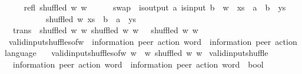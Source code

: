 \begin{isabellebody}
\ \ \isanewline
\ \ refl{\isacharcolon}{\kern0pt}\ {\isachardoublequoteopen}shuffled\ w\ w{\isachardoublequoteclose}\ {\isacharbar}{\kern0pt}\isanewline
\ \ \isanewline
\ \ swap{\isacharcolon}{\kern0pt}\ {\isachardoublequoteopen}{\isasymlbrakk}\ is{\isacharunderscore}{\kern0pt}output\ a{\isacharsemicolon}{\kern0pt}\ is{\isacharunderscore}{\kern0pt}input\ b\ {\isacharsemicolon}{\kern0pt}\ w\ {\isacharequal}{\kern0pt}\ {\isacharparenleft}{\kern0pt}xs\ {\isacharat}{\kern0pt}\ a\ {\isacharhash}{\kern0pt}\ b\ {\isacharhash}{\kern0pt}\ ys{\isacharparenright}{\kern0pt}\ {\isasymrbrakk}\ \isanewline
\ \ \ \ \ \ \ \ \ {\isasymLongrightarrow}\ shuffled\ w\ {\isacharparenleft}{\kern0pt}xs\ {\isacharat}{\kern0pt}\ b\ {\isacharhash}{\kern0pt}\ a\ {\isacharhash}{\kern0pt}\ ys{\isacharparenright}{\kern0pt}{\isachardoublequoteclose}\ {\isacharbar}{\kern0pt}\isanewline
\ \ \isanewline
\ \ trans{\isacharcolon}{\kern0pt}\ {\isachardoublequoteopen}{\isasymlbrakk}\ shuffled\ w\ w{\isacharprime}{\kern0pt}{\isacharsemicolon}{\kern0pt}\ shuffled\ w{\isacharprime}{\kern0pt}\ w{\isacharprime}{\kern0pt}{\isacharprime}{\kern0pt}\ {\isasymrbrakk}\ {\isasymLongrightarrow}\ shuffled\ w\ w{\isacharprime}{\kern0pt}{\isacharprime}{\kern0pt}{\isachardoublequoteclose}\isanewline
\isanewline
{}\isamarkupfalse%
\ valid{\isacharunderscore}{\kern0pt}input{\isacharunderscore}{\kern0pt}shuffles{\isacharunderscore}{\kern0pt}of{\isacharunderscore}{\kern0pt}w\ {\isacharcolon}{\kern0pt}{\isacharcolon}{\kern0pt}\ {\isachardoublequoteopen}{\isacharparenleft}{\kern0pt}{\isacharprime}{\kern0pt}information{\isacharcomma}{\kern0pt}\ {\isacharprime}{\kern0pt}peer{\isacharparenright}{\kern0pt}\ action\ word\ {\isasymRightarrow}\ {\isacharparenleft}{\kern0pt}{\isacharprime}{\kern0pt}information{\isacharcomma}{\kern0pt}\ {\isacharprime}{\kern0pt}peer{\isacharparenright}{\kern0pt}\ action\ language{\isachardoublequoteclose}\ \isanewline
\ \ {\isachardoublequoteopen}valid{\isacharunderscore}{\kern0pt}input{\isacharunderscore}{\kern0pt}shuffles{\isacharunderscore}{\kern0pt}of{\isacharunderscore}{\kern0pt}w\ w\ {\isasymequiv}\ {\isacharbraceleft}{\kern0pt}w{\isacharprime}{\kern0pt}{\isachardot}{\kern0pt}\ shuffled\ w\ w{\isacharprime}{\kern0pt}{\isacharbraceright}{\kern0pt}{\isachardoublequoteclose}\isanewline
\isanewline
{}\isamarkupfalse%
\ valid{\isacharunderscore}{\kern0pt}input{\isacharunderscore}{\kern0pt}shuffle\ {\isacharcolon}{\kern0pt}{\isacharcolon}{\kern0pt}\ \isanewline
\ \ {\isachardoublequoteopen}{\isacharparenleft}{\kern0pt}{\isacharprime}{\kern0pt}information{\isacharcomma}{\kern0pt}\ {\isacharprime}{\kern0pt}peer{\isacharparenright}{\kern0pt}\ action\ word\ {\isasymRightarrow}\ {\isacharparenleft}{\kern0pt}{\isacharprime}{\kern0pt}information{\isacharcomma}{\kern0pt}\ {\isacharprime}{\kern0pt}peer{\isacharparenright}{\kern0pt}\ action\ word\ {\isasymRightarrow}\ bool{\isachardoublequoteclose}\ {\isacharparenleft}{\kern0pt}\ {\isachardoublequoteopen}{\isasymsqunion}{\isasymsqunion}\isactrlsub {\isacharquery}{\kern0pt}{\isachardoublequoteclose}\ {}{}{\isacharparenright}{\kern0pt}\ \isanewline

\end{isabellebody}
